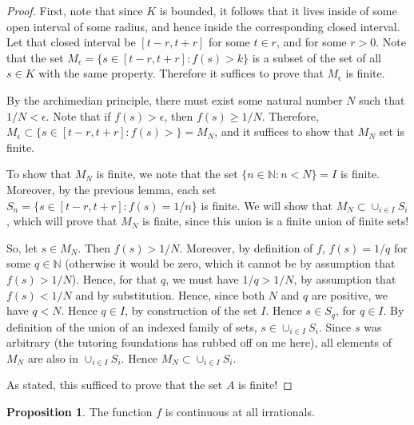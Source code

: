 \documentclass[12pt]{article}
\newcommand{\N}{\mathbb{N}}
\theoremstyle{definition}
\newtheorem{proposition}{Proposition}
\begin{document}
\begin{proof}
    First, note that since $K$ is bounded, it follows that it lives inside of some open interval of some radius, and hence inside the corresponding closed interval. Let that closed interval be $ [t - r, t + r] $ for some $t\in r$, and for some $r> 0$. Note that the set $ M_\epsilon = \{s\in [t - r, t + r]: f(s) > k\}  $ is a subset of the set of all $s\in K$ with the same property. Therefore it suffices to prove that $M_\epsilon$ is finite. 

    By the archimedian principle, there must exist some natural number $N$ such that $1/N < \epsilon$. Note that if $ f(s) > \epsilon $, then $ f(s) \ge 1/N $. Therefore, $M_\epsilon\subset \{s\in [t - r, t + r]: f(s) > \} = M_N$, and it suffices to show that $M_N$ set is finite. 

    To show that $M_N$ is finite, we note that the set $ \{n\in \N: n < N\} = I$ is finite. Moreover, by the previous lemma, each set $S_n = \{s\in [t - r, t + r]: f(s) = 1/n\}$ is finite. We will show that $ M_N \subset \cup_{i\in I}S_i $, which will prove that $M_N$ is finite, since this union is a finite union of finite sets!

    So, let $s\in M_N$. Then $ f(s) > 1/N $. Moreover, by definition of $f$, $f(s) = 1/q$ for some $q\in \N$ (otherwise it would be zero, which it cannot be by assumption that $f(s) > 1/N$). Hence, for that $q$, we must have $ 1/q > 1/N$, by assumption that $ f(s) < 1/N $ and by substitution. Hence, since both $N$ and $q$ are positive, we have $ q < N $. Hence $ q\in I $, by construction of the set $I$. Hence $s\in S_q$, for $q\in I$. By definition of the union of an indexed family of sets, $ s\in \cup_{i\in I}S_i $. Since $s$ was arbitrary (the tutoring foundations has rubbed off on me here), all elements of $M_N$ are also in $\cup_{i\in I}S_i$. Hence $M_N \subset \cup_{i\in I}S_i$. 
    
    As stated, this sufficed to prove that the set $A$ is finite! 

\end{proof}

\begin{proposition}
    The function $f$ is continuous at all irrationals. 
\end{proposition}
\end{document}
